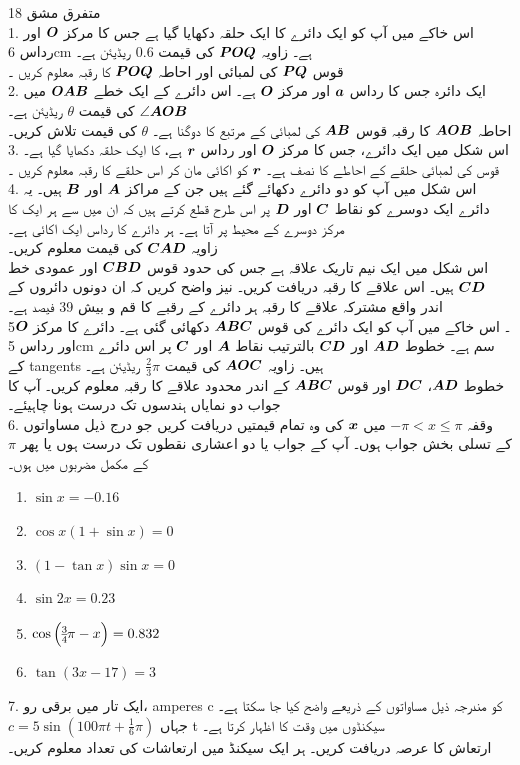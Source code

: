 متفرق مشق 18 \\
1. اس خاکے میں آپ کو ایک دائرے کا ایک حلقہ دکھایا گیا ہے جس کا مرکز
\( {{\boldsymbol{O}}}\) 
اور رداس
6cm
ہے۔ زاویہ 
\({{\boldsymbol{POQ}}}\)
کی قیمت
0.6
ریڈیئن ہے۔\\
قوس
\({{\boldsymbol{PQ}}}\)
کی لمبائی اور احاطہ
\({{\boldsymbol{POQ}}}\)
کا رقبہ معلوم کریں ۔\\
2. ایک دائرہ جس کا رداس
\({{\boldsymbol{a}}}\)
اور مرکز
\( {{\boldsymbol{O}}}\)
ہے۔ اس دائرے کے ایک خطے
\({{\boldsymbol{OAB}}}\)
میں
\(\angle {\ensuremath{{\boldsymbol{AOB}}}}\)
کی قیمت
\(\theta\)
ریڈیئن ہے۔\\
احاطہ
\( {{\boldsymbol{AOB}}}\)
کا رقبہ قوس
\({{\boldsymbol{AB}}}\)
کی لمبائی کے مرتبع کا دوگنا ہے۔
\(\theta\)
کی قیمت تلاش کریں۔\\
3. اس شکل میں ایک دائرے، جس کا مرکز
\( {{\boldsymbol{O}}}\)
اور رداس
\( {{\boldsymbol{r}}}\)
ہے، کا ایک حلقہ دکھایا گیا ہے۔ قوس کی لمبائی حلقے کے احاطے کا نصف ہے۔
\( {{\boldsymbol{r}}}\)
کو اکائی مان کر اس حلقے کا رقبہ معلوم کریں ۔\\
4. اس شکل میں آپ کو دو دائرے دکھائے گئے ہیں جن کے مراکز
\({{\boldsymbol{A}}}\)
اور
\({{\boldsymbol{B}}}\)
ہیں۔ یہ دائرے ایک دوسرے کو نقاط
\({{\boldsymbol{C}}}\)
اور
\({{\boldsymbol{D}}}\)
پر اس طرح قطع کرتے ہیں کہ ان میں سے ہر ایک کا مرکز دوسرے کے محیط پر آتا ہے۔ ہر دائرے کا رداس ایک اکائی ہے۔\\
زاویہ 
\({{\boldsymbol{CAD}}}\)
کی قیمت معلوم کریں۔\\
اس شکل میں ایک نیم تاریک علاقہ ہے جس کی حدود قوس
\({{\boldsymbol{CBD}}}\)
اور عمودی خط
\({{\boldsymbol{CD}}}\)
ہیں۔
اس علاقے کا رقبہ دریافت کریں۔
نیز واضح کریں کہ ان دونوں دائروں کے اندر واقع مشترکہ علاقے کا رقبہ ہر دائرے کے رقبے کا قم و بیش
39
فیصد ہے۔\\
5۔ اس خاکے میں آپ کو ایک دائرے کی قوس 
\( {{\boldsymbol{ABC}}}\)
دکھائی گئی ہے۔ دائرے کا مرکز
\( {{\boldsymbol{O}}}\)
اور رداس
5cm
سم ہے۔ خطوط
\( {{\boldsymbol{AD}}}\)
اور
\( {{\boldsymbol{CD}}}\)
بالترتیب نقاط
\( {{\boldsymbol{A}}}\)
اور
\( {{\boldsymbol{C}}}\)
پر اس دائرے کے tangents ہیں۔ زاویہ
\( {{\boldsymbol{AOC}}}\)
کی قیمت
\(\frac{2}{3} \pi\)
ریڈیئن ہے۔\\
خطوط
\( {{\boldsymbol{AD}}}\)،
\( {{\boldsymbol{DC}}}\)
اور قوس
\( {{\boldsymbol{ABC}}}\)
کے اندر محدود علاقے کا رقبہ معلوم کریں۔ آپ کا جواب دو نمایاں ہندسوں تک درست ہونا چاہیئے۔\\
6. وقفہ
\(-\pi<x\le\pi\)
میں
\( {{\boldsymbol{x}}}\)
کی وہ تمام قیمتیں دریافت کریں جو درج ذیل مساواتوں کے تسلی بخش جواب ہوں۔ آپ کے جواب یا دو اعشاری نقطوں تک درست ہوں یا پھر
\(\pi\)
کے مکمل مضربوں میں ہوں۔
\begin{enumerate}
\item \(\sin{x}=-0.16\)
\item \(\cos{x} (1+\sin{x})=0\)
\item \((1-\tan{x})\sin{x}=0\)
\item \(\sin{2x}=0.23\)
\item \(\cos\Big{(\frac{3}{4}\pi-x}\Big)=0.832\)
\item \(\tan(3x-17)=3\)
\end{enumerate}
7. ایک تار میں برقی رو، amperes c کو مندرجہ ذیل مساواتوں کے ذریعے واضح کیا جا سکتا ہے۔\\
\(c=5\sin(100\pi t+\frac{1}{6}\pi)\)
جہاں t سیکنڈوں میں وقت کا اظہار کرتا ہے۔\\
ارتعاش کا عرصہ دریافت کریں۔ ہر ایک سیکنڈ میں ارتعاشات کی تعداد معلوم کریں۔\\




